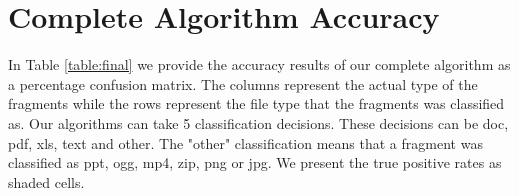 
\newpage
\section{Complete Algorithm Accuracy}\label{sec:6.3}
In Table \ref{table:final} we provide the accuracy results of our complete algorithm as a percentage confusion matrix. The columns represent the actual type of the fragments while the rows represent the file type that the fragments was classified as. Our algorithms can take 5 classification decisions. These decisions can be doc, pdf, xls, text and other. The "other" classification means that a fragment was classified as ppt, ogg, mp4, zip, png or jpg.  We present the true positive rates as shaded cells.


